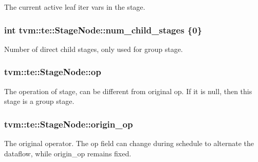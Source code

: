 The current active leaf iter vars in the stage. 

\subsubsection[{\texorpdfstring{num\+\_\+child\+\_\+stages}{num_child_stages}}]{\setlength{\rightskip}{0pt plus 5cm}int tvm\+::te\+::\+Stage\+Node\+::num\+\_\+child\+\_\+stages \{0\}}\hypertarget{classtvm_1_1te_1_1StageNode_a98769dd08ea20c6d72f9abfe80d20090}{}\label{classtvm_1_1te_1_1StageNode_a98769dd08ea20c6d72f9abfe80d20090}


Number of direct child stages, only used for group stage. 

\subsubsection[{\texorpdfstring{op}{op}}]{ tvm\+::te\+::\+Stage\+Node\+::op}\hypertarget{classtvm_1_1te_1_1StageNode_a1e98ce6b9c48fd7ec5077c06f35d2ae1}{}\label{classtvm_1_1te_1_1StageNode_a1e98ce6b9c48fd7ec5077c06f35d2ae1}


The operation of stage, can be different from original op. If it is null, then this stage is a group stage. 

\subsubsection[{\texorpdfstring{origin\+\_\+op}{origin_op}}]{ tvm\+::te\+::\+Stage\+Node\+::origin\+\_\+op}\hypertarget{classtvm_1_1te_1_1StageNode_a3e7c2fb80404a12a9e843fcb38accd78}{}\label{classtvm_1_1te_1_1StageNode_a3e7c2fb80404a12a9e843fcb38accd78}


The original operator. The op field can change during schedule to alternate the dataflow, while origin\+\_\+op remains fixed. 

